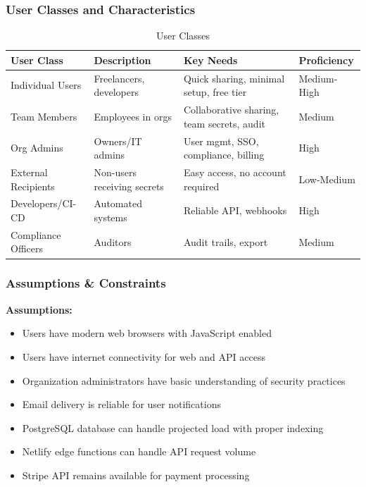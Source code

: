 \documentclass[12pt,a4paper]{article}
\begin{document}
\subsubsection{User Classes and Characteristics}
\begin{table}[H]
  \centering
  \small
  \caption{User Classes}
  \begin{tabular}{@{}p{2.8cm}p{3cm}p{4cm}p{2.2cm}@{}}
    \toprule
    \textbf{User Class} & \textbf{Description}        & \textbf{Key Needs}                         & \textbf{Proficiency} \\
    \midrule
    Individual Users    & Freelancers, developers     & Quick sharing, minimal setup, free tier    & Medium-High          \\
    \hline
    Team Members        & Employees in orgs           & Collaborative sharing, team secrets, audit & Medium               \\
    \hline
    Org Admins          & Owners/IT admins            & User mgmt, SSO, compliance, billing        & High                 \\
    \hline
    External Recipients & Non-users receiving secrets & Easy access, no account required           & Low-Medium           \\
    \hline
    Developers/CI-CD    & Automated systems           & Reliable API, webhooks                     & High                 \\
    \hline
    Compliance Officers & Auditors                    & Audit trails, export                       & Medium               \\
    \bottomrule
  \end{tabular}
\end{table}

\subsubsection{Assumptions \& Constraints}

\textbf{Assumptions:}
\begin{itemize}[leftmargin=*, itemsep=0.1em]
  \item Users have modern web browsers with JavaScript enabled
  \item Users have internet connectivity for web and API access
  \item Organization administrators have basic understanding of security practices
  \item Email delivery is reliable for user notifications
  \item PostgreSQL database can handle projected load with proper indexing
  \item Netlify edge functions can handle API request volume
  \item Stripe API remains available for payment processing
\end{itemize}
\end{document}
